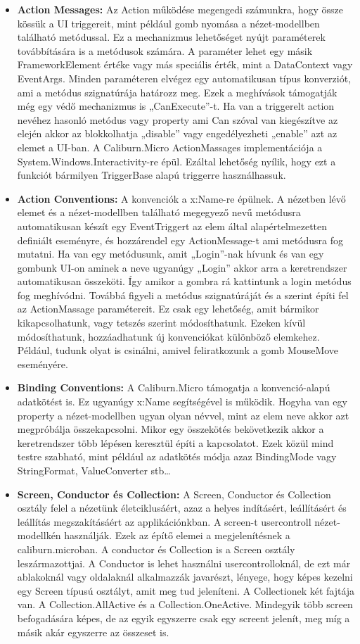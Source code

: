 \documentclass[
]{thesis-ekf}
\theoremstyle{definition}
\theoremstyle{remark}
\begin{document}
\begin{itemize}[leftmargin=*]
\item \textbf{Action Messages: }Az Action működése megengedi számunkra, hogy össze kössük a UI triggereit, mint például gomb nyomása a nézet-modellben található metódussal. Ez a mechanizmus lehetőséget nyújt paraméterek továbbítására is a metódusok számára. A paraméter lehet egy másik FrameworkElement értéke vagy más speciális érték, mint a DataContext vagy EventArgs. Minden paraméteren elvégez egy automatikusan típus konverziót, ami a metódus szignatúrája határozz meg. Ezek a meghívások támogatják még egy védő mechanizmus is „CanExecute”-t. Ha van a triggerelt action nevéhez hasonló metódus vagy property ami Can szóval van kiegészítve az elején akkor az blokkolhatja „disable” vagy engedélyezheti „enable” azt az elemet a UI-ban. A Caliburn.Micro ActionMassages implementációja a System.Windows.Interactivity-re épül. Ezáltal lehetőség nyílik, hogy ezt a funkciót bármilyen TriggerBase alapú triggerre használhassuk.\cite{caliburn}	
\item \textbf{Action Conventions: }A konvenciók a x:Name-re épülnek. A nézetben lévő elemet és a nézet-modellben található megegyező nevű metódusra automatikusan készít egy EventTriggert az elem által alapértelmezetten definiált eseményre, és hozzárendel egy ActionMessage-t ami metódusra fog mutatni. Ha van egy metódusunk, amit „Login”-nak hívunk és van egy gombunk UI-on aminek a neve ugyanúgy „Login” akkor arra a keretrendszer automatikusan összeköti. Így amikor a gombra rá kattintunk a login metódus fog meghívódni. Továbbá figyeli a metódus szignatúráját és a szerint építi fel az ActionMassage paramétereit. Ez csak egy lehetőség, amit bármikor kikapcsolhatunk, vagy tetszés szerint módosíthatunk. Ezeken kívül módosíthatunk, hozzáadhatunk új konvenciókat különböző elemkehez. Például, tudunk olyat is csinálni, amivel feliratkozunk a gomb MouseMove eseményére.  \cite{caliburn}
\item \textbf{Binding Conventions: }A Caliburn.Micro támogatja a konvenció-alapú adatkötést is. Ez ugyanúgy x:Name segítségével is működik. Hogyha van egy property a nézet-modellben ugyan olyan névvel, mint az elem neve akkor azt megpróbálja összekapcsolni. Mikor egy összekötés bekövetkezik akkor a keretrendszer több lépésen keresztül építi a kapcsolatot. Ezek közül mind testre szabható, mint például az adatkötés módja azaz BindingMode vagy StringFormat, ValueConverter stb\dots 	\cite{caliburn}
\item \textbf{Screen, Conductor és Collection: }A Screen, Conductor és Collection osztály felel a nézetünk életciklusáért, azaz a helyes indításért, leállításért és leállítás megszakításáért az applikációnkban. A screen-t usercontroll nézet-modellkén használják. Ezek az építő elemei a megjelenítésnek a caliburn.microban. A conductor és Collection is a Screen osztály leszármazottjai. A Conductor is lehet használni usercontrolloknál, de ezt már ablakoknál vagy oldalaknál alkalmazzák javarészt, lényege, hogy képes kezelni egy Screen típusú osztályt, amit meg tud jeleníteni. A Collectionek két fajtája van.  A Collection.AllActive és a Collection.OneActive. Mindegyik több screen befogadására képes, de az egyik egyszerre csak egy screent jelenít, meg míg a másik akár egyszerre az összeset is.

\end{itemize}
\end{document}

